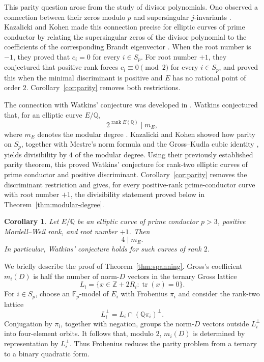 \documentclass[10pt,a4paper]{amsart}
\newtheorem{corollary}[theorem]{Corollary}
\newcommand{\Q}{\mathbb{Q}}
\newcommand{\F}{\mathbb{F}}
\begin{document}
This parity question arose from the study of divisor polynomials. Ono observed a connection between their zeros modulo $p$ and supersingular $j$-invariants \cite[p.~118]{Ono2004}. Kazalicki and Kohen made this connection precise for elliptic curves of prime conductor by relating the supersingular zeros of the divisor polynomial to the coefficients of the corresponding Brandt eigenvector \cite{KazalickiKohen2017}. When the root number is $-1$, they proved that $c_i=0$ for every $i\in S_p$. For root number $+1$, they conjectured that positive rank forces $c_i\equiv0\pmod2$ for every $i\in S_p$, and proved this when the minimal discriminant is positive and $E$ has no rational point of order $2$. Corollary~\ref{cor:parity} removes both restrictions.

The connection with Watkins' conjecture was developed in \cite{KazalickiKohen2018,KazalickiKohenCorrigendum2019}. Watkins conjectured that, for an elliptic curve $E/\Q$,
\[
  2^{\operatorname{rank}E(\Q)}\mid m_E,
\]
where $m_E$ denotes the modular degree \cite[Conjecture~4.1]{Watkins2002}. Kazalicki and Kohen showed how parity on $S_p$, together with Mestre's
norm formula \cite[Section~3, formula~(5), Theorem~3.2]{Mestre1986} and
the Gross--Kudla cubic identity
\cite[Corollary~11.5]{GrossKudla1992}, yields divisibility by $4$ of the
modular degree. Using their previously established parity theorem, this proved Watkins'
conjecture for rank-two elliptic curves of prime conductor and positive
discriminant. Corollary~\ref{cor:parity} removes the discriminant restriction and gives,
for every positive-rank prime-conductor curve with root number $+1$,
the divisibility statement proved below in
Theorem~\ref{thm:modular-degree}.

\begin{corollary}
Let $E/\Q$ be an elliptic curve of prime conductor $p>3$, positive Mordell--Weil rank, and root number $+1$. Then
\[
  4\mid m_E.
\]
In particular, Watkins' conjecture holds for such curves of rank $2$.
\end{corollary}



We briefly describe the proof of Theorem~\ref{thm:spanning}. Gross's
coefficient $m_i(D)$ is half the number of norm-$D$ vectors in the ternary
Gross lattice
\[
  L_i=\{x\in\mathbb Z+2R_i:\operatorname{tr}(x)=0\}.
\]
For $i\in S_p$, choose an $\F_p$-model of $E_i$ with Frobenius $\pi_i$ and
consider the rank-two lattice
\[
  L_i^\perp=L_i\cap(\Q\pi_i)^\perp.
\]
Conjugation by $\pi_i$, together with negation, groups the norm-$D$ vectors
outside $L_i^\perp$ into four-element orbits. It follows that, modulo $2$,
$m_i(D)$ is determined by representation by $L_i^\perp$. Thus Frobenius
reduces the parity problem from a ternary to a binary quadratic form.
\end{document}
